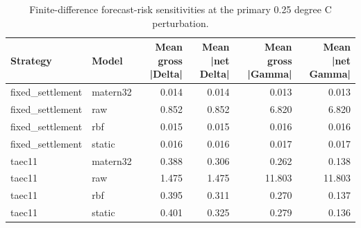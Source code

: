 \begin{table}
\caption{Finite-difference forecast-risk sensitivities at the primary 0.25 degree C perturbation.}
\label{tab:greek-like-risk}
\begin{tabular}{llrrrr}
\toprule
Strategy & Model & Mean gross |Delta| & Mean |net Delta| & Mean gross |Gamma| & Mean |net Gamma| \\
\midrule
fixed\_settlement & matern32 & 0.014 & 0.014 & 0.013 & 0.013 \\
fixed\_settlement & raw & 0.852 & 0.852 & 6.820 & 6.820 \\
fixed\_settlement & rbf & 0.015 & 0.015 & 0.016 & 0.016 \\
fixed\_settlement & static & 0.016 & 0.016 & 0.017 & 0.017 \\
taec11 & matern32 & 0.388 & 0.306 & 0.262 & 0.138 \\
taec11 & raw & 1.475 & 1.475 & 11.803 & 11.803 \\
taec11 & rbf & 0.395 & 0.311 & 0.270 & 0.137 \\
taec11 & static & 0.401 & 0.325 & 0.279 & 0.136 \\
\bottomrule
\end{tabular}
\end{table}
